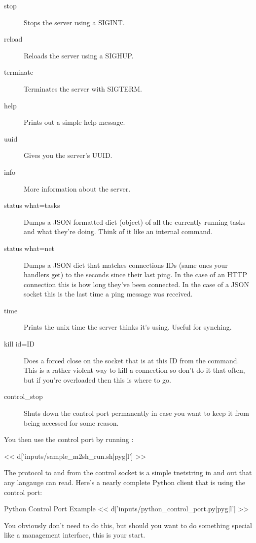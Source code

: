 \begin{description}
\item[stop] Stops the server using a SIGINT.
\item[reload] Reloads the server using a SIGHUP.
\item[terminate] Terminates the server with SIGTERM.
\item[help] Prints out a simple help message.
\item[uuid] Gives you the server's UUID.
\item[info] More information about the server.
\item[status what=tasks] Dumps a JSON formatted dict (object) of all the currently
    running tasks and what they're doing.  Think of it like an internal 
    command.
\item[status what=net] Dumps a JSON dict that matches connections IDs (same ones your
        handlers get) to the seconds since their last ping.  In the case of an
        HTTP connection this is how long they've been connected.  In the case
        of a JSON socket this is the last time a ping message was received.
\item[time] Prints the unix time the server thinks it's using.  Useful for synching.
\item[kill id=ID] Does a forced close on the socket that is at this ID from the 
    command.  This is a rather violent way to kill a connection so don't do it that
    often, but if you're overloaded then this is where to go.
\item[control\_stop] Shuts down the control port permanently in case you want to keep
    it from being accessed for some reason.
\end{description}

You then use the control port by running :

<< d['inputs/sample_m2sh_run.sh|pyg|l'] >>

The protocol to and from the control socket is a simple tnetstring in and out that
any langauge can read.  Here's a nearly complete Python client that is using
the control port:

\begin{code}{Python Control Port Example}
<< d['inputs/python_control_port.py|pyg|l'] >>
\end{code}

You obviously don't need to do this, but should you want to do
something special like a management interface, this is your start.


